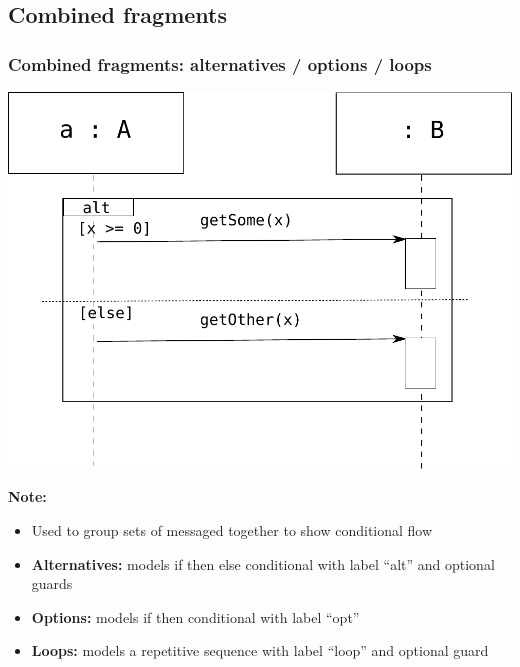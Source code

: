 \documentclass{beamer}
\begin{document}
\subsection{Combined fragments}
\begin{frame}
	\frametitle{Combined fragments: alternatives / options / loops}
	\begin{center}
		\includegraphics[scale=0.25]{alt}
	\end{center}
	\textbf{Note:}
	\begin{itemize}
  			\item Used to group sets of messaged together to show conditional flow
  			\item \textbf{Alternatives:} models if then else conditional with label ``alt'' and optional guards
  			\item \textbf{Options:} models if then conditional with label ``opt''
  			\item \textbf{Loops:} models a repetitive sequence with label ``loop'' and optional guard
	\end{itemize}
\end{frame}
\end{document}

